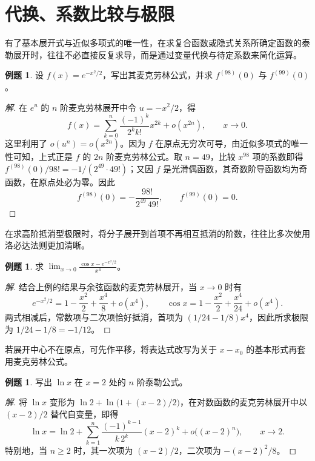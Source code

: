 \documentclass[UTF8,fontset=fandol,a4paper,12pt]{ctexart}
\theoremstyle{definition}
\newtheorem{example}[theorem]{例题}
\begin{document}
\section{代换、系数比较与极限}
有了基本展开式与近似多项式的唯一性，在求复合函数或隐式关系所确定函数的泰勒展开时，往往不必直接反复求导，而是通过变量代换与待定系数来简化运算。

\begin{example}
设 $f(x)=e^{-x^2/2}$，写出其麦克劳林公式，并求 $f^{(98)}(0)$ 与 $f^{(99)}(0)$。
\end{example}

\begin{proof}[解]
在 $e^u$ 的 $n$ 阶麦克劳林展开中令 $u=-x^2/2$，得
\[
 f(x)=\sum_{k=0}^{n}\frac{(-1)^k}{2^k k!}x^{2k}+o(x^{2n}),\qquad x\to0.
\]
这里利用了 $o(u^n)=o(x^{2n})$。因为 $f$ 在原点无穷次可导，由近似多项式的唯一性可知，上式正是 $f$ 的 $2n$ 阶麦克劳林公式。取 $n=49$，比较 $x^{98}$ 项的系数即得 $f^{(98)}(0)/98!=-1/(2^{49}\cdot 49!)$；又因 $f$ 是光滑偶函数，其奇数阶导函数均为奇函数，在原点处必为零。因此
\[
 f^{(98)}(0)=-\frac{98!}{2^{49}\,49!},\qquad f^{(99)}(0)=0.
\]
\end{proof}

在求高阶抵消型极限时，将分子展开到首项不再相互抵消的阶数，往往比多次使用洛必达法则更加清晰。

\begin{example}
求 $\displaystyle\lim_{x\to0}\frac{\cos x-e^{-x^2/2}}{x^4}$。
\end{example}

\begin{proof}[解]
结合上例的结果与余弦函数的麦克劳林展开，当 $x\to0$ 时有
\[
 e^{-x^2/2}=1-\frac{x^2}{2}+\frac{x^4}{8}+o(x^4),\qquad
 \cos x=1-\frac{x^2}{2}+\frac{x^4}{24}+o(x^4).
\]
两式相减后，常数项与二次项恰好抵消，首项为 $(1/24-1/8)x^4$，因此所求极限为 $1/24-1/8=-1/12$。
\end{proof}

若展开中心不在原点，可先作平移，将表达式改写为关于 $x-x_0$ 的基本形式再套用麦克劳林公式。

\begin{example}
写出 $\ln x$ 在 $x=2$ 处的 $n$ 阶泰勒公式。
\end{example}

\begin{proof}[解]
将 $\ln x$ 变形为 $\ln 2+\ln\bigl(1+(x-2)/2\bigr)$，在对数函数的麦克劳林展开中以 $(x-2)/2$ 替代自变量，即得
\[
 \ln x=\ln 2+\sum_{k=1}^n\frac{(-1)^{k-1}}{k\,2^k}(x-2)^k+o\bigl((x-2)^n\bigr),\qquad x\to2.
\]
特别地，当 $n\ge2$ 时，其一次项为 $(x-2)/2$，二次项为 $-(x-2)^2/8$。
\end{proof}
\end{document}
